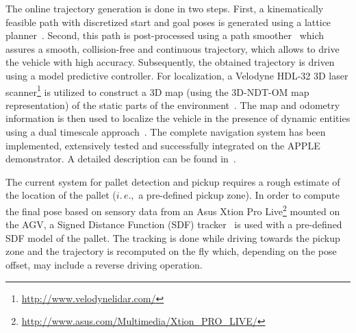 The online trajectory generation is done in two steps. First, a kinematically feasible path with
discretized start and goal poses is generated using a lattice planner~\cite{Ciri14}. Second, this
path is post-processed using a path smoother~\cite{Andr15} which assures a smooth, collision-free
and continuous trajectory, which allows to drive the vehicle with high accuracy. Subsequently, the
obtained trajectory is driven using a model predictive controller. For localization, a Velodyne
HDL-32 3D laser scanner\footnote{\url{http://www.velodynelidar.com/}} is utilized to construct a 3D
map (using the 3D-NDT-OM map representation) of the static parts of the
environment~\cite{Stoy13}. The map and odometry information is then used to localize the vehicle in
the presence of dynamic entities using a dual timescale approach~\cite{Vale14}. The complete
navigation system has been implemented, extensively tested and successfully integrated on the APPLE
demonstrator. A detailed description can be found in~\cite{Andr15}.

The current system for pallet detection and pickup requires a rough estimate of the location of the
pallet ($i.\,e.,$ a pre-defined pickup zone). In order to compute the final pose based on sensory
data from an Asus Xtion Pro Live\footnote{\url{http://www.asus.com/Multimedia/Xtion_PRO_LIVE/}}
mounted on the AGV, a Signed Distance Function (SDF) tracker~\cite{Cane13} is used with a pre-defined
SDF model of the pallet. The tracking is done while driving towards the pickup zone and the
trajectory is recomputed on the fly which, depending on the pose offset, may include a reverse
driving operation.
%

